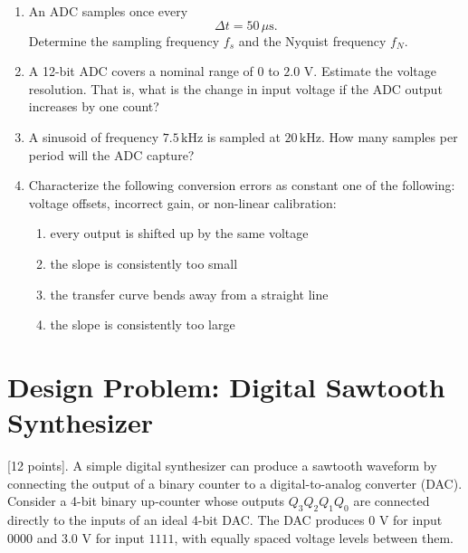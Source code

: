 \documentclass[10pt]{article}
\begin{document}
\begin{enumerate}
\item An ADC samples once every
\[
\Delta t=50\,\mu\mathrm{s}.
\]
Determine the sampling frequency $f_s$ and the Nyquist frequency $f_N$. \\ \vspace{0.5cm}
\item A 12-bit ADC covers a nominal range of $0$ to $2.0$ V. Estimate the voltage resolution.  That is, what is the change in input voltage if the ADC output increases by one count? \\ \vspace{1.5cm}
\item A sinusoid of frequency $7.5\,\mathrm{kHz}$ is sampled at $20\,\mathrm{kHz}$.  How many samples per period will the ADC capture? \\ \vspace{2cm}
\item Characterize the following conversion errors as constant one of the following: voltage offsets, incorrect gain, or non-linear calibration:
\begin{enumerate}
\item every output is shifted up by the same voltage
\item the slope is consistently too small
\item the transfer curve bends away from a straight line
\item the slope is consistently too large
\end{enumerate}
\end{enumerate}

\section{Design Problem: Digital Sawtooth Synthesizer}

[12 points]. A simple digital synthesizer can produce a sawtooth waveform by connecting the output of a binary counter to a digital-to-analog converter (DAC). Consider a 4-bit binary up-counter whose outputs $Q_3Q_2Q_1Q_0$ are connected directly to the inputs of an ideal 4-bit DAC. The DAC produces $0$ V for input $0000$ and $3.0$ V for input $1111$, with equally spaced voltage levels between them.
\end{document}
